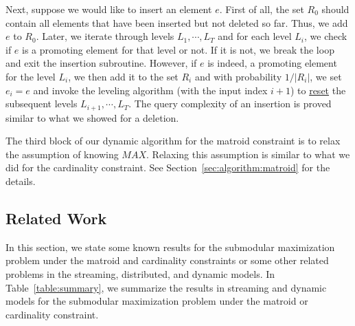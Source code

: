 \documentclass[11pt]{article}
\begin{document}
Next, suppose we would like to insert an element $e$. 
First of all, the set $R_0$ should contain all elements that have been inserted but not deleted so far. 
Thus, we add $e$ to $R_0$. 
Later, we iterate through levels $L_1,\cdots,L_T$ and 
for each level $L_i$, we check if $e$ is a promoting element for that level or not. 
If it is not, we break the loop and exit the insertion subroutine. 
However, if $e$ is indeed, a promoting element for the level $L_i$, 
we then add it to the set $R_i$ and with probability $1/|R_i|$, 
we set $e_i=e$ and invoke the leveling algorithm (with the input index $i+1$) to \underline{reset} 
the subsequent levels $L_{i+1},\cdots, L_T$. 
The query complexity of an insertion is proved similar to what we showed for a deletion. 




The third block of our dynamic algorithm for the matroid constraint is to relax the assumption of knowing $MAX$. 
Relaxing this assumption is similar to what we did for the cardinality constraint. 
See Section~\ref{sec:algorithm:matroid} for the details. 




\subsection{Related Work}
In this section, we state some known results for the submodular maximization problem under the matroid and cardinality constraints or some other related problems in the streaming, distributed, and dynamic models. 
In Table~\ref{table:summary}, we summarize the results in streaming and dynamic models for the submodular maximization problem under the matroid or cardinality constraint.
\end{document}
